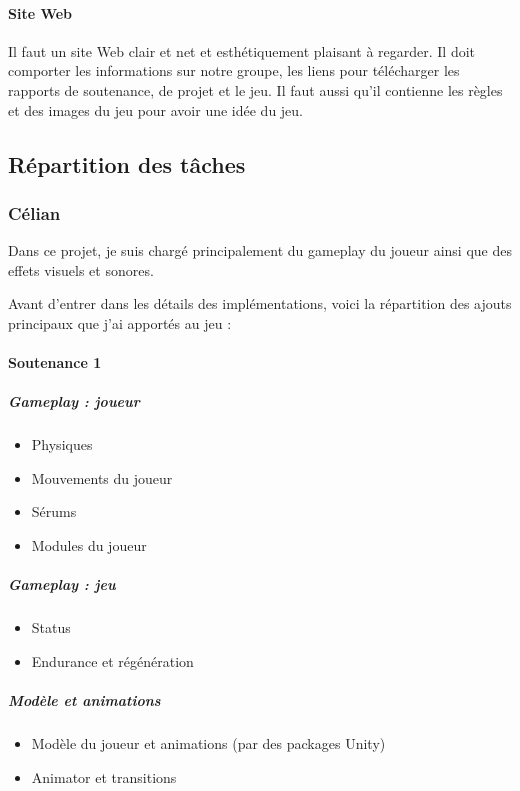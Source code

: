 \documentclass{article}
\begin{document}
\paragraph{Site Web}
Il faut un site Web clair et net et esthétiquement plaisant à regarder. Il doit comporter les informations sur notre groupe, les liens pour télécharger les rapports de soutenance, de projet et le jeu. Il faut aussi qu'il contienne les règles et des images du jeu pour avoir une idée du jeu.

\newpage
\subsection{Répartition des tâches}




\subsubsection{Célian}

Dans ce projet, je suis chargé principalement du gameplay du joueur ainsi que des effets visuels et sonores.

Avant d'entrer dans les détails des implémentations, voici la répartition des ajouts principaux que j'ai apportés au jeu :

\paragraph{Soutenance 1}

\subparagraph{Gameplay : joueur}

\begin{itemize}
    \item Physiques
    \item Mouvements du joueur
    \item Sérums
    \item Modules du joueur
\end{itemize}

\subparagraph{Gameplay : jeu}

\begin{itemize}
    \item Status
    \item Endurance et régénération
\end{itemize}

\subparagraph{Modèle et animations}

\begin{itemize}
    \item Modèle du joueur et animations (par des packages Unity)
    \item Animator et transitions
\end{itemize}
\end{document}
